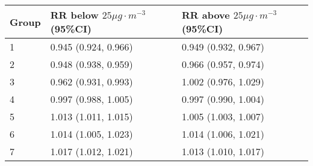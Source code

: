 \begin{tabular}{lll}
  \hline
Group & RR below $25 \mu g \cdot m^{-3}$ (95\%CI) & RR above $25 \mu g \cdot m^{-3}$ (95\%CI) \\ 
  \hline
   1 & 0.945 (0.924, 0.966) & 0.949 (0.932, 0.967) \\ 
     2 & 0.948 (0.938, 0.959) & 0.966 (0.957, 0.974) \\ 
     3 & 0.962 (0.931, 0.993) & 1.002 (0.976, 1.029) \\ 
     4 & 0.997 (0.988, 1.005) & 0.997 (0.990, 1.004) \\ 
     5 & 1.013 (1.011, 1.015) & 1.005 (1.003, 1.007) \\ 
     6 & 1.014 (1.005, 1.023) & 1.014 (1.006, 1.021) \\ 
     7 & 1.017 (1.012, 1.021) & 1.013 (1.010, 1.017) \\ 
   \hline
\end{tabular}

